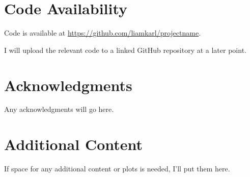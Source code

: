 \documentclass[reprint,preprintnumbers,amsmath,amssymb,aps,nofootinbib,showkeys]{revtex4-2}
\begin{document}
\section*{Code Availability}

    Code is available at \url{https://github.com/liamkarl/projectname}.

    I will upload the relevant code to a linked GitHub repository at a later point.


\section*{Acknowledgments}

    Any acknowledgments will go here.


\appendix
\section{Additional Content}

    If space for any additional content or plots is needed, I'll put them here.


\end{document}

